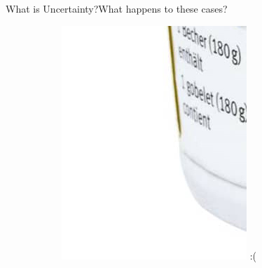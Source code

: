 \documentclass{beamer}
\begin{document}
\begin{frame}{What is Uncertainty?}{What happens to these cases?}
\begin{figure}[H]
\begin{subfigure}{.32\textwidth}
		\includegraphics[width=\textwidth]{m-classic-joghurt-ahornsirup-stichfest-zoom3}
		\pause
		:(
	\end{subfigure}
\end{figure}
\end{frame}
\end{document}

